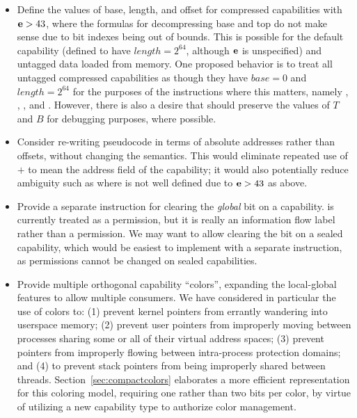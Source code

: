 \begin{itemize}
\item
  Define the values of base, length, and offset for compressed
  capabilities with ${\bf e}{} > 43$, where the formulas for
  decompressing base and top do not make sense due to bit indexes
  being out of bounds.  This is possible for the default capability
  (defined to have $length = 2^{64}$, although ${\bf e}{}$ is
  unspecified) and untagged data loaded from memory. One proposed
  behavior is to treat all untagged compressed capabilities as though
  they have $base=0$ and $length=2^{64}$ for the purposes of the
  instructions where this matters, namely ,
  , ,
  and .
  However, there is also a desire that  should preserve
    the values of $T$ and $B$ for debugging purposes, where possible.

\item
  Consider re-writing pseudocode in terms of absolute addresses rather
  than offsets, without changing the semantics. This would eliminate
  repeated use of \cbase{} $+$ \coffset{} to mean the address field of the
  capability; it would also potentially reduce ambiguity such as where
  \cbase{} is not well defined due to ${\bf e}{} > 43$ as above.

\item
  Provide a separate instruction for clearing the \emph{global} bit on a
  capability.  \cappermG is currently treated as a permission, but it is
  really an information flow label rather than a permission. We may want to
  allow clearing the \cappermG bit on a sealed capability, which would
  be easiest to implement with a separate instruction, as permissions cannot
  be changed on sealed capabilities.

\item
  Provide multiple orthogonal capability ``colors'', expanding the
  local-global features to allow multiple consumers.
  We have considered in particular the use of colors to: (1) prevent kernel
  pointers from errantly wandering into userspace memory; (2) prevent user
  pointers from improperly moving between processes sharing some or all of
  their virtual address spaces; (3) prevent pointers from improperly flowing
  between intra-process protection domains; and (4) to prevent stack pointers
  from being improperly shared between threads.
  Section~\ref{sec:compactcolors} elaborates a more efficient representation
  for this coloring model, requiring one rather than two bits per color, by
  virtue of utilizing a new capability type to authorize color management.


\end{itemize}
